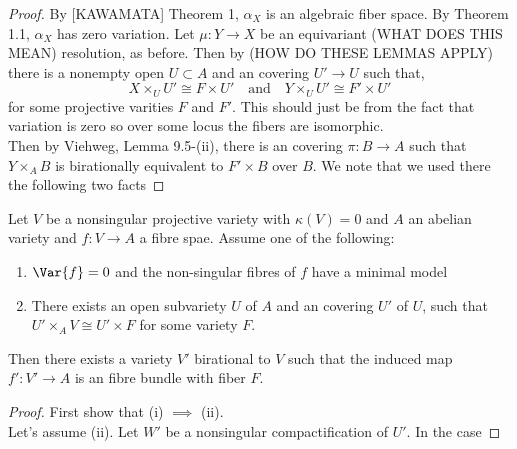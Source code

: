 \documentclass[12pt]{article}
\begin{document}
\begin{proof}
By [KAWAMATA] Theorem 1, $\alpha_X$ is an algebraic fiber space. By Theorem 1.1, $\alpha_X$ has zero variation. Let $\mu : Y \to X$ be an equivariant (WHAT DOES THIS MEAN) resolution, as before. Then by (HOW DO THESE LEMMAS APPLY) there is a nonempty open $U \subset A$ and an \etale covering $U' \to U$ such that,
\[ X \times_U U' \cong F \times U' \quad \text{and} \quad Y \times_U U' \cong F' \times U' \]
for some projective varities $F$ and $F'$. This should just be from the fact that variation is zero so over some locus the fibers are isomorphic. 
\bigskip\\
Then by Viehweg, Lemma 9.5-(ii), there is an \etale covering $\pi : B \to A$ such that $Y \times_A B$ is birationally equivalent to $F' \times B$ over $B$. We note that we used there the following two facts
\end{proof}

\begin{lemma}
Let $V$ be a nonsingular projective variety with $\kappa(V) = 0$ and $A$ an abelian variety and $f : V \to A$ a fibre spae. Assume one of the following:
\begin{enumerate}
\item $\Var{f} = 0$ and the non-singular fibres of $f$ have a minimal model
\item There exists an open subvariety $U$ of $A$ and an \etale covering $U'$ of $U$, such that $U' \times_A V \cong U' \times F$ for some variety $F$.
\end{enumerate}
Then there exists a variety $V'$ birational to $V$ such that the induced map $f' : V' \to A$ is an \etale fibre bundle with fiber $F$.
\end{lemma}

\begin{proof}
First show that (i) $\implies$ (ii).
\bigskip\\
Let's assume (ii). Let $W'$ be a nonsingular compactification of $U'$. In the case
\end{proof}
\end{document}
